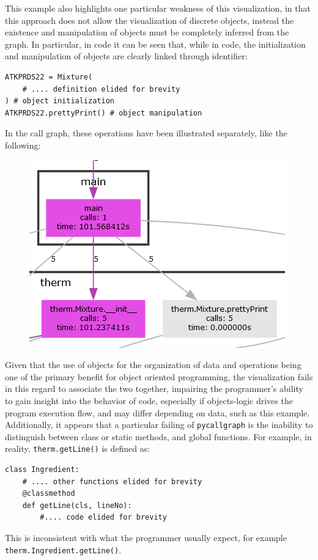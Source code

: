 \documentclass[conference]{IEEEtran}
\begin{document}
This example also highlights one particular weakness of this visualization, in that this approach does not allow the visualization of discrete objects, instead the existence and manipulation of objects must be completely inferred from the graph. In particular, in code it can be seen that, while in code, the initialization and manipulation of objects are clearly linked through identifier:
\begin{lstlisting}
ATKPRDS22 = Mixture(
	# .... definition elided for brevity
) # object initialization
ATKPRDS22.prettyPrint() # object manipulation
\end{lstlisting}
In the call graph, these operations have been illustrated separately, like the following:
\begin{figure}[h!]
  \centering
  \includegraphics[width=0.6\linewidth]{cglimit1}  
\end{figure}
Given that the use of objects for the organization of data and operations being one of the primary benefit for object oriented programming, the visualization fails in this regard to associate the two together, impairing the programmer's ability to gain insight into the behavior of code, especially if objects-logic drives the program execution flow, and may differ depending on data, such as this example. Additionally, it appears that a particular failing of \lstinline!pycallgraph! is the inability to distinguish between class or static methods, and global functions. For example, in reality, \lstinline!therm.getLine()! is defined as:
\begin{lstlisting}
class Ingredient:
	# .... other functions elided for brevity
	@classmethod
	def getLine(cls, lineNo):
		#.... code elided for brevity
\end{lstlisting}
This is inconsistent with what the programmer usually expect, for example \lstinline!therm.Ingredient.getLine()!.\par
\end{document}
